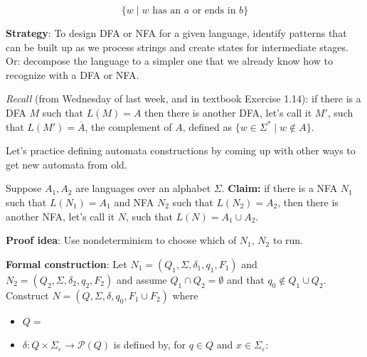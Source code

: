 \documentclass[12pt, oneside]{article}
\begin{document}
\vfill

\[
    \{ w \mid \text{$w$ has an $a$ or ends in $b$}\}
\]

\vfill



\textbf{Strategy}: To design DFA or NFA for a given language,  
identify patterns that can be built up as we process strings and create states
for intermediate stages. Or: decompose the language to a simpler one 
that we already know how to recognize with a DFA or NFA.


{\it Recall} (from Wednesday of last week, and in textbook Exercise 1.14): 
if there is a DFA $M$ such that $L(M) = A$ then there is another DFA, let's call it $M'$, such that 
$L(M') = \overline{A}$, the complement of $A$, defined as $\{ w \in \Sigma^* \mid w \notin A \}$.


Let's practice defining automata constructions by coming up with other ways to get new automata from old.
\newpage

Suppose $A_1, A_2$ are languages over an alphabet $\Sigma$.
{\bf Claim:} if there is a NFA $N_1$ such that $L(N_1) = A_1$ and 
NFA $N_2$ such that $L(N_2) = A_2$, then there is another NFA, let's call it $N$, such that 
$L(N) = A_1 \cup A_2$.

{\bf Proof idea}: Use nondeterminism to choose which of $N_1$, $N_2$ to run.

\vfill

{\bf Formal construction}: Let 
$N_1 = (Q_1, \Sigma, \delta_1, q_1, F_1)$ and $N_2 = (Q_2, \Sigma, \delta_2,q_2, F_2)$
and assume $Q_1 \cap Q_2 = \emptyset$ and that $q_0 \notin Q_1 \cup Q_2$.
Construct $N = (Q, \Sigma, \delta, q_0, F_1 \cup F_2)$ where
\begin{itemize}
    \item $Q = $
    \item $\delta: Q \times \Sigma_\varepsilon \to \mathcal{P}(Q)$ is defined by, for $q \in Q$ and $x \in \Sigma_{\varepsilon}$:
        \[
            \phantom{\delta((q,x))=\begin{cases}  \delta_1 ((q,x)) &\qquad\text{if } q\in Q_1 \\ \delta_2 ((q,x)) &\qquad\text{if } q\in Q_2 \\ \{q1,q2\} &\qquad\text{if } q = q_0, x = \varepsilon \\ \emptyset\text{if } q= q_0, x \neq \varepsilon \end{cases}}
        \]
\end{itemize}
\end{document}

